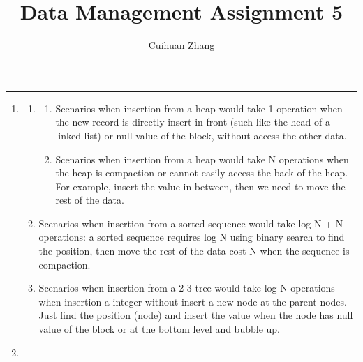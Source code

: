 \documentclass[12pt]{extarticle}
\title{Data Management Assignment 5}
\author{Cuihuan Zhang}
\begin{document}
\maketitle \vspace{-10mm}
\rule{\linewidth}{0.4pt}


\begin{flushleft}
\begin{enumerate}

\item

\begin{enumerate}

\item

\begin{enumerate}
\item Scenarios when insertion from a heap would take 1 operation when the new record is directly insert in front (such like the head of a linked list) or null value of the block, without access the other data.
\item Scenarios when insertion from a heap would take N operations when the heap is compaction or cannot easily access the back of the heap. For example, insert the value in between, then we need to move the rest of the data.
\end{enumerate}

\item Scenarios when insertion from a sorted sequence would take log N + N operations: a sorted sequence requires log N using binary search to find the position, then move the rest of the data cost N when the sequence is compaction.

\item Scenarios when insertion from a 2-3 tree would take log N operations when insertion a integer without insert a new node at the parent nodes. Just find the position (node) and insert the value when the node has null value of the block or at the bottom level and bubble up.
\end{enumerate}

\item
\begin{enumerate}


\end{enumerate}
\end{enumerate}
\end{flushleft}
\end{document}
